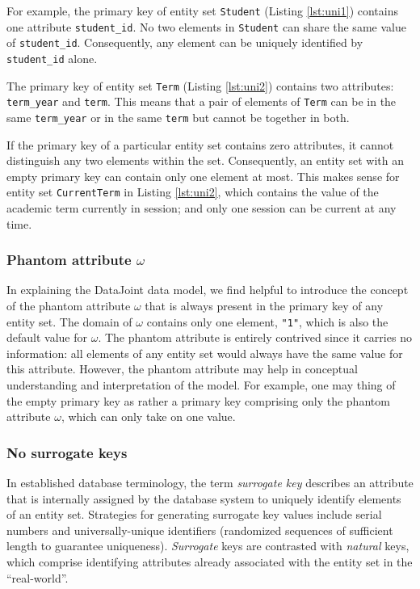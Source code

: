 \documentclass[letter,10pt]{article}
\newcommand{\datajoint}{DataJoint\xspace}
\begin{document}
For example, the primary key of entity set \lstinline$Student$ (Listing \ref{lst:uni1}) contains one attribute \lstinline$student_id$.  
No two elements in \lstinline$Student$ can share the same value of \lstinline$student_id$. 
Consequently, any element can be uniquely identified by \lstinline$student_id$ alone. 

The primary key of entity set \lstinline$Term$ (Listing \ref{lst:uni2}) contains two attributes: \lstinline$term_year$ and \lstinline$term$.
This means that a pair of elements of \lstinline$Term$ can be in the same \lstinline$term_year$ or in the same \lstinline$term$ but cannot be together in both. 

If the primary key of a particular entity set contains zero attributes, it cannot distinguish any two elements within the set.  
Consequently, an entity set with an empty primary key can contain only one element at most.
This makes sense for entity set \lstinline$CurrentTerm$ in Listing \ref{lst:uni2}, which contains the value of the academic term currently in session; and only one session can be current at any time.

\subsubsection{Phantom attribute $\omega$}\label{sec:phantom}
In explaining the \datajoint data model, we find helpful to introduce the concept of the phantom attribute $\omega$ that is always present in the primary key of any entity set.  
The domain of $\omega$ contains only one element, \lstinline$"1"$, which is also the default value for $\omega$.
The phantom attribute is entirely contrived since it carries no information: all elements of any entity set would always have the same value for this attribute.
However, the phantom attribute may help in conceptual understanding and interpretation of the model.
For example, one may thing of the empty primary key as rather a primary key comprising only the phantom attribute $\omega$, which can only take on one value.
 
\subsubsection{No surrogate keys}
In established database terminology, the term \emph{surrogate key} describes an attribute that is internally assigned by the database system to uniquely identify elements of an entity set. 
Strategies for generating surrogate key values include serial numbers and universally-unique identifiers (randomized sequences of sufficient length to guarantee uniqueness).
\emph{Surrogate} keys are contrasted with \emph{natural} keys, which comprise identifying attributes already associated with the entity set in the ``real-world''.
\end{document}
